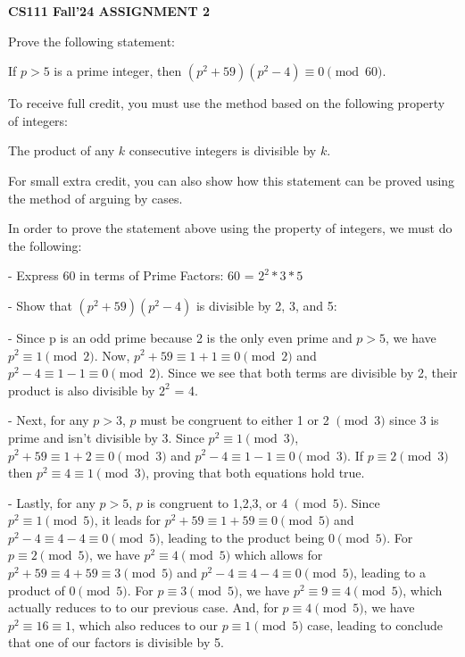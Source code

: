 \documentclass{article}
\begin{document}
\centerline{\large \bf CS111 Fall'24 ASSIGNMENT 2}

\vskip 0.2in

\begin{problem}

\vspace{0.05in}
\noindent  Prove the following statement: 


\noindent 
If $p > 5$ is a prime integer,
then $(p^2 +59)(p^2 -4)\equiv 0 \pmod{60}$.

\vspace{0.1in}
\noindent  
To receive full credit, you must use the method based on the following property of integers: 

\noindent The product of any $k$ consecutive integers is divisible by $k$.

\vspace{0.1in}
\noindent For small extra credit, you can also show how this statement can be proved using the method of arguing by cases.

\vspace{0.1in}
\noindent In order to prove the statement above using the property of integers, we must do the following:

\vspace{0.1in}
-  Express 60 in terms of Prime Factors: 60 = $2^2 * 3 * 5$

\vspace{0.1in}
- Show that $(p^2+59)(p^2-4)$ is divisible by 2, 3, and 5: 

\vspace{0.1in}
\indent\indent - Since p is an odd prime because 2 is the only even prime and $p > 5$, we have $p^2 \equiv 1 \pmod{2}$. Now, $p^2 + 59 \equiv 1 + 1 \equiv 0 \pmod{2}$ and $p^2 - 4 \equiv 1 - 1 \equiv 0 \pmod{2}$. Since we see that both terms are divisible by 2, their product is also divisible by $2^2$ = 4.

\vspace{0.1in}
\indent\indent - Next, for any $p > 3$, $p$ must be congruent to either 1 or 2 $\pmod{3}$ since 3 is prime and isn't divisible by 3. Since $p^2 \equiv 1 \pmod{3}$, $p^2 +59 \equiv 1 + 2 \equiv 0 \pmod{3}$ and $p^2 - 4 \equiv 1 - 1 \equiv 0 \pmod{3}$. If $p \equiv 2 \pmod{3}$ then $p^2 \equiv 4 \equiv 1 \pmod{3}$, proving that both equations hold true.

\vspace{0.1in}
\indent\indent - Lastly, for any $p > 5$, $p$ is congruent to 1,2,3, or 4 $\pmod{5}$. Since $p^2 \equiv 1 \pmod{5}$, it leads for $p^2 + 59 \equiv 1 + 59 \equiv 0 \pmod{5}$ and $p^2 - 4 \equiv 4 - 4 \equiv 0 \pmod{5}$, leading to the product being $0 \pmod{5}$. For $p \equiv 2 \pmod{5}$, we have $p^2 \equiv 4 \pmod{5}$ which allows for $p^2 + 59 \equiv 4 + 59 \equiv 3 \pmod{5}$ and $p^2 - 4 \equiv 4 - 4 \equiv 0 \pmod{5}$, leading to a product of $0 \pmod{5}$. For $p \equiv 3 \pmod{5}$, we have $p^2 \equiv 9 \equiv 4 \pmod{5}$, which actually reduces to to our previous case. And, for $p \equiv 4 \pmod{5}$, we have $p^2 \equiv 16 \equiv 1$, which also reduces to our $p \equiv 1 \pmod{5}$ case, leading to conclude that one of our factors is divisible by 5.


\end{problem}
\end{document}

